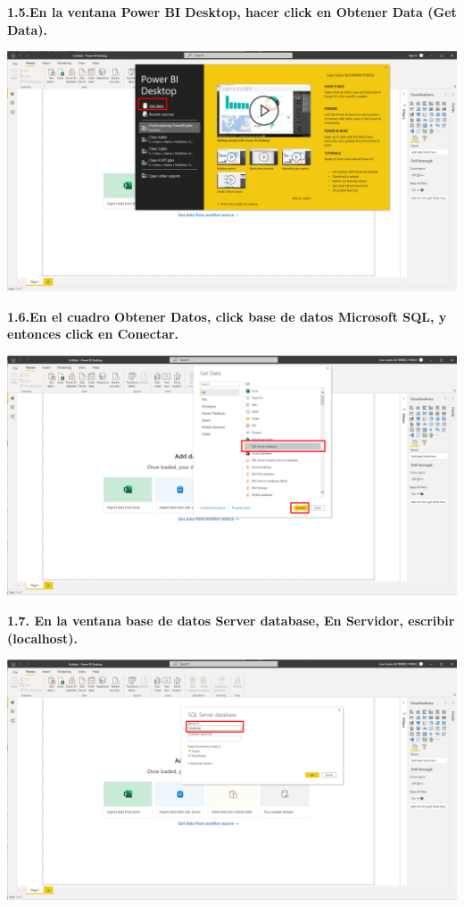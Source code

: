 \documentclass{article}
\begin{document}
\newpage
\textbf{1.5.En la ventana Power BI Desktop, hacer click en Obtener Data \textbf{(Get Data)}.}

    \begin{center}
		\includegraphics[width=14cm]{./images/5} 
	\end{center}

\textbf{1.6.En el cuadro Obtener Datos, click base de datos \textbf{Microsoft SQL}, y entonces click en Conectar.}

    \begin{center}
		\includegraphics[width=14cm]{./images/6} 
	\end{center}
\newpage
\textbf{1.7. En la ventana base de datos Server database, En \textbf{Servidor}, escribir \textbf{(localhost)}.}

    \begin{center}
		\includegraphics[width=14cm]{./images/7} 
	\end{center}
\end{document}
